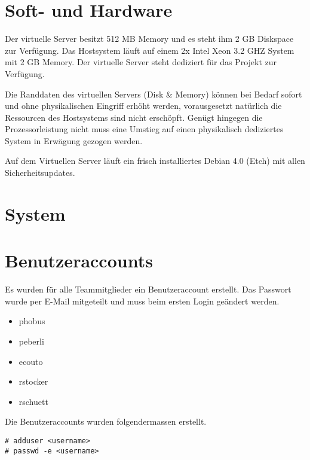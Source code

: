 \documentclass[12pt,halfparskip]{scrreprt}
\begin{document}
\section{Soft- und Hardware} %
\label{sec:soft_und_hardware}

Der virtuelle Server besitzt 512 MB Memory und es steht ihm 2 GB Diskspace zur Verfügung. Das Hostsystem läuft auf einem 2x Intel Xeon 3.2 GHZ System mit 2 GB Memory. Der virtuelle Server steht dediziert für das Projekt zur Verfügung.

Die Randdaten des virtuellen Servers (Disk \& Memory) können bei Bedarf sofort und ohne physikalischen Eingriff erhöht werden, vorausgesetzt natürlich die Ressourcen des Hostsystems sind nicht erschöpft. Genügt hingegen die Prozessorleistung nicht muss eine Umstieg auf einen physikalisch dediziertes System in Erwägung gezogen werden.

Auf dem Virtuellen Server läuft ein frisch installiertes Debian 4.0 (Etch) mit allen Sicherheitsupdates.


\section{System} %
\label{sec:system}


\section{Benutzeraccounts} %
\label{sec:benutzeraccounts}

Es wurden für alle Teammitglieder ein Benutzeraccount erstellt. Das Passwort wurde per E-Mail mitgeteilt und muss beim ersten Login geändert werden.

\begin{itemize}
  \item phobus
  \item peberli
  \item ecouto
  \item rstocker
  \item rschuett
\end{itemize}

Die Benutzeraccounts wurden folgendermassen erstellt. 

\begin{verbatim}
# adduser <username>
# passwd -e <username>
\end{verbatim}
\end{document}

